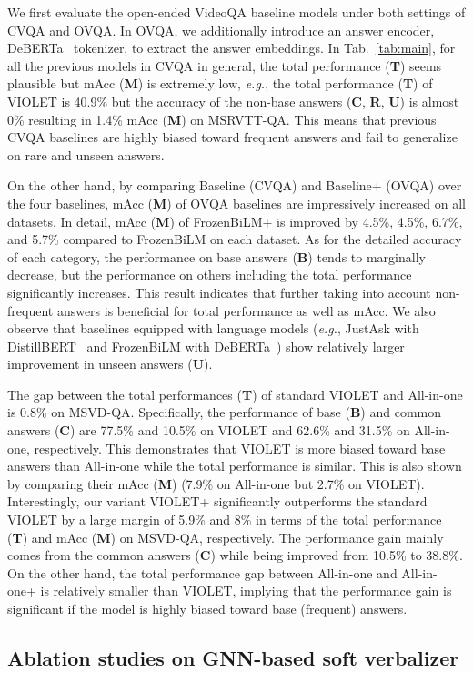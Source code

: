 \documentclass[10pt,twocolumn,letterpaper]{article}
\begin{document}
We first evaluate the open-ended VideoQA baseline models under both settings of CVQA and OVQA.
In OVQA, we additionally introduce an answer encoder, DeBERTa~\cite{he2020deberta} tokenizer, to extract the answer embeddings.
In Tab.~\ref{tab:main}, for all the previous models in CVQA in general, the total performance (\textbf{T}) seems plausible but mAcc (\textbf{M}) is extremely low, \textit{e.g.}, the total performance (\textbf{T}) of VIOLET is 40.9\% but the accuracy of the non-base answers (\textbf{C}, \textbf{R}, \textbf{U}) is almost 0\% resulting in 1.4\% mAcc (\textbf{M}) on MSRVTT-QA.
This means that previous CVQA baselines are highly biased toward frequent answers and fail to generalize on rare and unseen answers.

On the other hand, by comparing Baseline (CVQA) and Baseline+ (OVQA) over the four baselines, mAcc (\textbf{M}) of OVQA baselines are impressively increased on all datasets.
In detail, mAcc (\textbf{M}) of FrozenBiLM+ is improved by 4.5\%, 4.5\%, 6.7\%, and 5.7\% compared to FrozenBiLM on each dataset.
As for the detailed accuracy of each category, the performance on base answers (\textbf{B}) tends to marginally decrease, but the performance on others including the total performance significantly increases.
This result indicates that further taking into account non-frequent answers is beneficial for total performance as well as mAcc.
We also observe that baselines equipped with language models (\textit{e.g.}, JustAsk with DistillBERT~\cite{sanh2019distilbert} and FrozenBiLM with DeBERTa~\cite{he2020deberta}) show relatively larger improvement in unseen answers (\textbf{U}).

The gap between the total performances (\textbf{T}) of standard VIOLET and All-in-one is 0.8\% on MSVD-QA.
Specifically, the performance of base (\textbf{B}) and common answers (\textbf{C}) are 77.5\% and 10.5\% on VIOLET and 62.6\% and 31.5\% on All-in-one, respectively.
This demonstrates that VIOLET is more biased toward base answers than All-in-one while the total performance is similar.
This is also shown by comparing their mAcc (\textbf{M}) (7.9\% on All-in-one but 2.7\% on VIOLET).
Interestingly, our variant VIOLET+ significantly outperforms the standard VIOLET by a large margin of 5.9\% and 8\% in terms of the total performance (\textbf{T}) and mAcc (\textbf{M}) on MSVD-QA, respectively.
The performance gain mainly comes from the common answers (\textbf{C}) while being improved from 10.5\% to 38.8\%.
On the other hand, the total performance gap between All-in-one and All-in-one+ is relatively smaller than VIOLET, implying that the performance gain is significant if the model is highly biased toward base (frequent) answers. \subsection{Ablation studies on GNN-based soft verbalizer}
\label{subsec:ablation}
\end{document}
